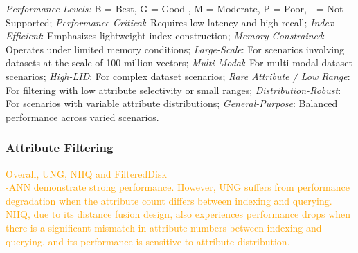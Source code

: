\documentclass[sigconf, nonacm]{acmart}
\begin{document}
{\begin{table}[htbp]
\footnotesize{
	\begin{minipage}{\linewidth}
		\vspace{0.1cm}
		\textit{Performance Levels:} B = Best, G = Good , M = Moderate, P = Poor, - = Not Supported;
		\textit{Performance-Critical}: Requires low latency and high recall;
		\textit{Index-Efficient}: Emphasizes lightweight index construction;
		\textit{Memory-Constrained}: Operates under limited memory conditions;
		\textit{Large-Scale}: For scenarios involving datasets at the scale of 100 million vectors;
		\textit{Multi-Modal}: For multi-modal dataset scenarios;
		\textit{High-LID}: For complex dataset scenarios;
		\textit{Rare Attribute / Low Range}: For filtering with low attribute selectivity or small ranges;
		\textit{Distribution-Robust}: For scenarios with variable attribute distributions;
		\textit{General-Purpose}: Balanced performance across varied scenarios.
	
\end{minipage}}

\end{table}

	
	\subsubsection{Attribute Filtering}
\textcolor{orange}{
Overall, UNG, NHQ and FilteredDisk\\-ANN demonstrate strong performance. However, UNG suffers from performance degradation when the attribute count differs between indexing and querying. NHQ, due to its distance fusion design, also experiences performance drops when there is a significant mismatch in attribute numbers between indexing and querying, and its performance is sensitive to attribute distribution. }

}
\end{document}
